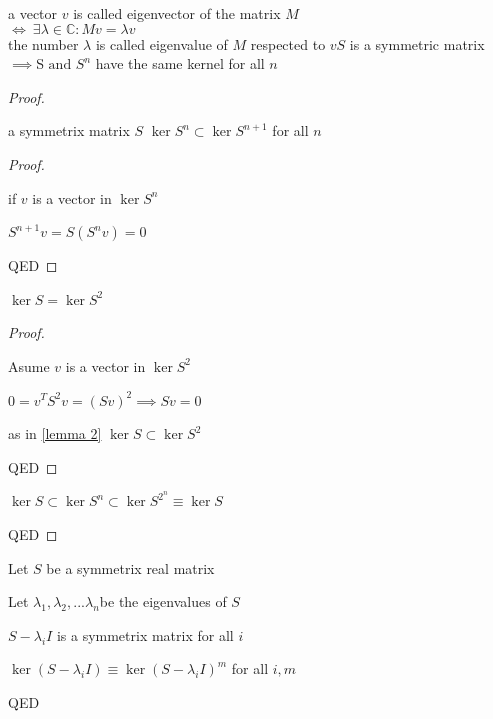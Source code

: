 \label{eigenvectors definition}

a vector $v$ is called eigenvector of the matrix $M$ \\$\iff ~ \exists \lambda \in \mathbb{C} : Mv = \lambda v$ \\the number $\lambda$ is called eigenvalue of $M$ respected to $v$
​
\label{same kernel lemma}
$S$ is a symmetric matrix\\$\implies $S$ \text{ and } S^n$ h​ave the same kernel for all $n$

\begin{proof}
\label{input}

​a symmetrix matrix $S$
\label{lemma 2}
$\ker S^n \subset \ker S^{n+1}$ for all $n$​

\begin{proof}
\label{#17}

if $v$ is a vector in $\ker S^n$​
\label{#18}

​$S^{n+1}v = S(S^n v) = 0$
\label{#19}

​QED

\end{proof}
\label{lemma 1}
$\ker S = \ker S^2$ ​

\begin{proof}
\label{#0}

Asume $v$ is a vector in $\ker S^2$​
\label{#2}

$0 = v^TS^2v = (Sv)^2 \implies Sv = 0$​
\label{#14}

​as in \ref{lemma 2} $\ker S \subset \ker S^2$
\label{#16}

QED​

\end{proof}
\label{#13}

$\ker S \subset \ker S^n \subset \ker S^{2^n} \equiv \ker S$​
\label{#11}

QED​

\end{proof}
\label{#1}

Let $S$ be a symmetrix real matrix
\label{v_i definition}

Let $\lambda_1, \lambda_2,...\lambda_n$ ​​be the eigenvalues of $S$
\label{#6}

$S - \lambda_i I$ is a symmetrix matrix for all $i$​
\label{#7}

$\ker (S - \lambda_i I) \equiv \ker (S - \lambda_i I)^m$ for all $i, m$​
\label{conclusion}

​QED
